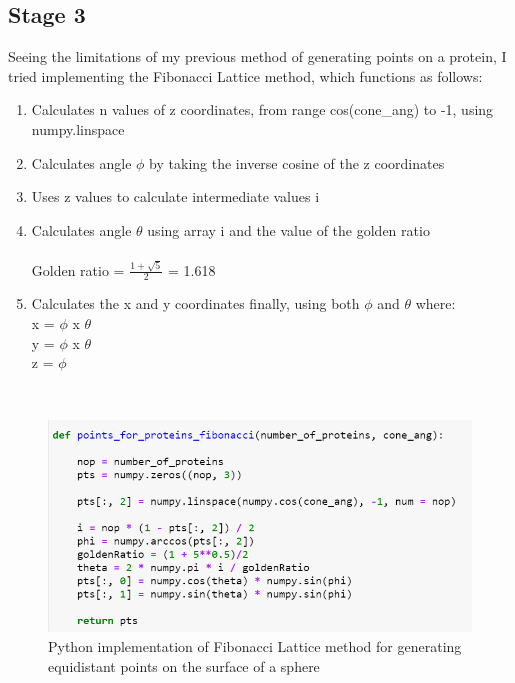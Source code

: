 \documentclass[12pt, a4paper]{report}
\begin{document}
\clearpage
\subsection*{Stage 3} 

Seeing the limitations of my previous method of generating points on a protein, I tried implementing the Fibonacci Lattice method, which functions as follows: 
\begin{enumerate}
    \item Calculates n values of z coordinates, from range cos(cone\_ang) to -1, using numpy.linspace 
    \item Calculates angle $\phi$ by taking the inverse cosine of the z coordinates
    \item Uses z values to calculate intermediate values i 
    \item Calculates angle $\theta$ using array i and the value of the golden ratio 
    \\~\\ 
    Golden ratio = \( \frac{1 + \sqrt{5}}{2}\) = 1.618
    \item Calculates the x and y coordinates finally, using both $\phi$ and $\theta$ where: 
    \\
    x = \sin$\phi$ x \cos$\theta$
    \\
    y = \sin$\phi$ x \sin$\theta$ 
    \\
    z = \cos$\phi$
\end{enumerate}
\\ 
\begin{figure}[h]
    \includegraphics[scale=0.7]{images/fibonacci method.png} 
    \centering 
    \caption{Python implementation of Fibonacci Lattice method for generating equidistant points on the surface of a sphere}
    \centering
\end{figure} 
\end{document}
